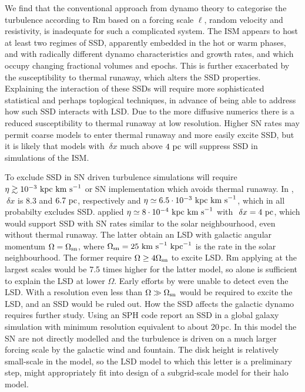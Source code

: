 \documentclass[preprint2]{aastex63}
\newcommand\OSN{\Omega_{\rm sn}}
\newcommand\kpc{~ {\rm kpc}}
\newcommand\pc{~ {\rm pc}}
\newcommand\dx{~ {\delta x}}
\newcommand\kms{~ {\rm km~ s}^{-1}}
\begin{document}
We find that the conventional approach from dynamo theory to categorise the 
turbulence according to Rm based on a forcing scale $\ell$, random velocity and
resistivity, is inadequate for such a complicated system.
The ISM appears to host at least two regimes of SSD, apparently
embedded in the hot or warm phases, and with radically different 
dynamo characteristics and growth rates, and which occupy changing fractional
volumes and epochs.
This is further exacerbated by the susceptibility to thermal runaway, which 
alters the SSD properties.
Explaining the interaction of these SSDs will require more sophisticated
statistical and perhaps toplogical techniques, in advance of being able to 
address how such SSD interacts with LSD.
Due to the more diffusive numerics there is a reduced susceptibility to
thermal runaway at low resolution. 
Higher SN rates may permit coarse models to enter thermal
runaway and more easily excite SSD, but it is likely that models with 
$\dx$ much above $4\pc$ will suppress SSD in simulations of the ISM.

To exclude SSD in SN driven turbulence simulations will require
$\eta\gtrsim10^{-3}\kpc\kms$ or SN implementation which avoids thermal runaway.
In \citet{Gressel:2008,GE20}, $\dx$ is 8.3 and $6.7\pc$, respectively
and $\eta\simeq6.5\cdot10^{-3}\kpc\kms$, which in all probabilty excludes SSD.
\citet{Gent:2013b} applied $\eta\simeq8\cdot10^{-4}\kpc\kms$ with $\dx=4\pc$,
which would support SSD with SN rates similar to the solar neighbourhood, even
without thermal runaway.
The latter obtain an LSD with galactic angular momentum $\Omega=\OSN$, where
$\OSN=25\kms\kpc^{-1}$ is the rate in the solar neighbourhood.
The former require $\Omega\geq4\OSN$ to excite LSD.
Rm applying at the largest scales would be 7.5 times higher for the latter 
model, so alone is sufficient to explain the LSD at lower $\Omega$.
Early efforts by \citet{Korpi:1999b} were unable to detect even the LSD.
With a resolution even less than \citet{Gressel:2008} $\Omega\gg\OSN$ would be 
required to excite the LSD, and an SSD would be ruled out.
%
How the SSD affects the galactic dynamo requires further study.
Using an SPH code \citet{SBADMN19} report an SSD in a global galaxy simulation
with minimum resolution equivalent to about 20\,pc.
In this model the SN are not directly modelled and the turbulence is driven
on a much larger forcing scale by the galactic wind and fountain.
The disk height is relatively small-scale in the model, so the LSD model
to which this letter is a preliminary step, might appropriately fit into
design of a subgrid-scale model for their halo model.
%
\end{document}
